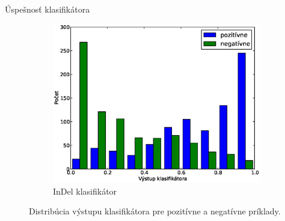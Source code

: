 \documentclass[xcolor=dvipsnames, compress, 12pt]{beamer}
\theoremstyle{definition}
\begin{document}
\begin{frame}{Úspešnosť klasifikátora}
\begin{figure}[h]
\begin{subfigure}[b]{0.45\textwidth}
                \includegraphics[width=\textwidth]{images/randomforest_combined_5_indel_test}
                \caption{InDel klasifikátor}
        \end{subfigure}
        \caption{Distribúcia výstupu klasifikátora pre pozitívne a negatívne príklady.}
\end{figure}
\end{frame}
\end{document}
